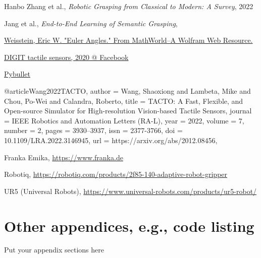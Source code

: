 \documentclass[12pt, a4paper]{report}
\theoremstyle{definition}
\begin{document}
\begin{thebibliography}{9}
    Hanbo Zhang et al.,
    \textit{Robotic Grasping from Classical to Modern: A Survey},
    2022
    
    Jang et al.,
    \textit{End-to-End Learning of Semantic Grasping},
    

    \href{https://mathworld.wolfram.com/EulerAngles.html}{Weisstein, Eric W. "Euler Angles." From MathWorld--A Wolfram Web Resource.}

    \href{https://digit.ml/}{DIGIT tactile sensors, 2020 @ Facebook}

    \href{https://pybullet.org/wordpress/}{Pybullet}

@article{Wang2022TACTO,
  author   = {Wang, Shaoxiong and Lambeta, Mike and Chou, Po-Wei and Calandra, Roberto},
  title    = {{TACTO}: A Fast, Flexible, and Open-source Simulator for High-resolution Vision-based Tactile Sensors},
  journal  = {IEEE Robotics and Automation Letters (RA-L)},
  year     = {2022},
  volume   = {7},
  number   = {2},
  pages    = {3930--3937},
  issn     = {2377-3766},
  doi      = {10.1109/LRA.2022.3146945},
  url      = {https://arxiv.org/abs/2012.08456},
}

    Franka Emika, \href{https://www.franka.de}{https://www.franka.de}

    Robotiq, \href{https://robotiq.com/products/2f85-140-adaptive-robot-gripper}{https://robotiq.com/products/2f85-140-adaptive-robot-gripper}

    UR5 (Universal Robots), \href{https://www.universal-robots.com/products/ur5-robot/}{https://www.universal-robots.com/products/ur5-robot/}

\end{thebibliography}

\chapter{Other appendices, e.g., code listing}
Put your appendix sections here
\end{document}
